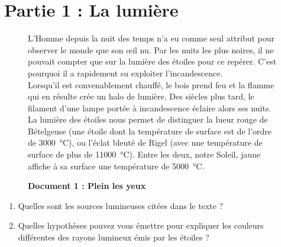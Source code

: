 \documentclass[a4paper,11pt,fleqn]{article}%
\begin{document}
\maketitle

\section*{Partie 1 : La lumière}
\begin{figure}[h!]
    \caption*{\textbf{Document 1 : Plein les yeux}}
     L’Homme depuis la nuit des temps n’a eu comme seul attribut pour observer le monde que son œil nu. Par les nuits les plus noires, il ne pouvait compter que sur la lumière des étoiles pour ce repérer. C’est pourquoi il a rapidement su exploiter l’incandescence.\\
     Lorsqu’il est convenablement chauffé, le bois prend feu et la flamme qui en résulte crée un halo de lumière. Des siècles plus tard, le filament d’une lampe portée à incandescence éclaire alors ses nuits. La lumière des étoiles nous permet de distinguer la lueur rouge de Bételgeuse (une étoile dont la température de surface est de l’ordre de \SI{3000}{\celsius}), ou l’éclat bleuté de Rigel (avec une température de surface de plus de \SI{11000}{\celsius}). Entre les deux, notre Soleil, jaune affiche à sa surface une température de \SI{5000}{\celsius}.
     \label{fig:doc1}
\end{figure}
\begin{enumerate}
    \item Quelles sont les sources lumineuses citées dans le texte ?
    \item Quelles hypothèses pouvez vous émettre pour expliquer les couleurs différentes des rayons lumineux émis par les étoiles ?
\end{enumerate}
\end{document}
